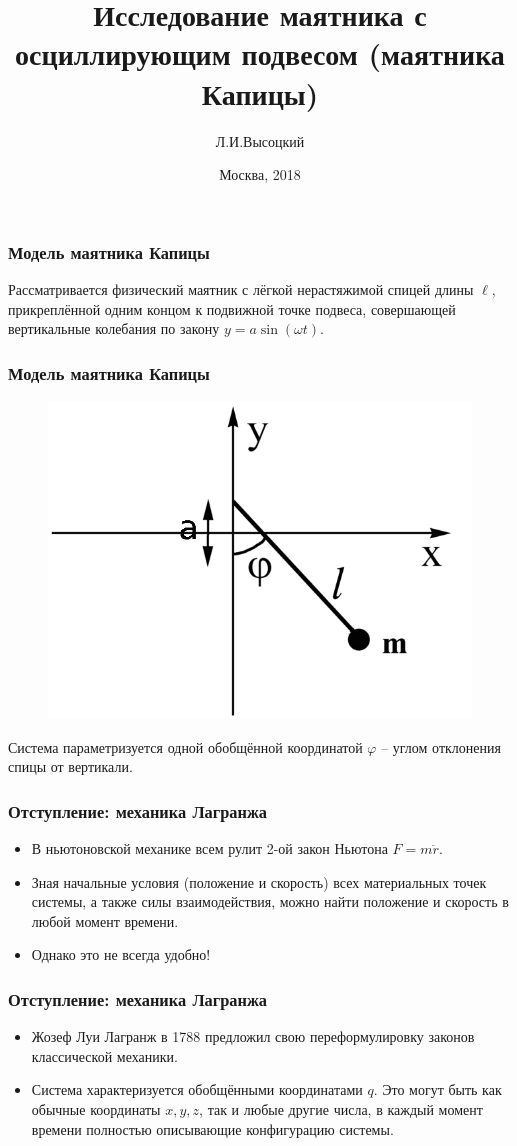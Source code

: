 \documentclass[14pt]{beamer}
\title{Исследование маятника с осциллирующим подвесом (маятника Капицы)}
\author{Л.И.Высоцкий\vspace{2.5cm}}
\date{\small{Москва, 2018}}
\begin{document}
\maketitle

\begin{frame}
\frametitle{Модель маятника Капицы}
Рассматривается физический маятник с лёгкой нерастяжимой спицей длины $\ell$, прикреплённой одним концом к
подвижной точке подвеса, совершающей вертикальные колебания по закону $y = a \sin(\omega t)$.
\end{frame}

\begin{frame}
\frametitle{Модель маятника Капицы}
\begin{figure}
\includegraphics[width=0.6\linewidth]{640px-KapitzaPendulumScheme}
\end{figure}
\pause
Система параметризуется одной обобщённой координатой $\varphi$ -- углом отклонения спицы от вертикали.
\end{frame}


\begin{frame}
\frametitle{Отступление: механика Лагранжа}
\begin{itemize}[<+->]
\item В ньютоновской механике всем рулит 2-ой закон Ньютона $F = m\ddot{r}$.
\item Зная начальные условия (положение и скорость) всех материальных точек системы, а также силы взаимодействия, можно найти положение и скорость в любой момент времени.
\item Однако это не всегда удобно!
\end{itemize}
\end{frame}

\begin{frame}
\frametitle{Отступление: механика Лагранжа}
\begin{itemize}[<+->]
\item Жозеф Луи Лагранж в 1788 предложил свою переформулировку законов классической механики.
\item Система характеризуется обобщёнными координатами $q$. Это могут быть как обычные координаты $x,y,z$, так и любые другие числа, в каждый момент времени полностью описывающие конфигурацию системы.
\end{itemize}
\end{frame}
\end{document}
